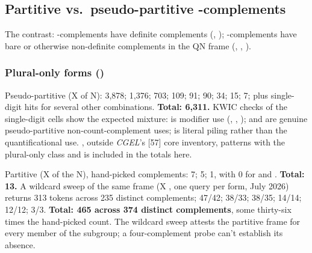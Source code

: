 \subsection{\texorpdfstring{Partitive vs.~pseudo-partitive -complements}{Partitive vs. pseudo-partitive of-complements}}\label{a.2-partitive-vs.-pseudo-partitive-of-complements}

The contrast:  -complements have definite complements (, );  -complements have bare or otherwise non-definite complements in the QN frame (, , ).

\subsubsection{\texorpdfstring{Plural-only forms ()}{Plural-only forms (lots, bags, heaps, loads, oodles, stacks, piles)}}

Pseudo-partitive (X of N):  3,878;  1,376;  703;  109;  91;  90;  34;  15;  7; plus single-digit hits for several other combinations. \textbf{Total: 6,311.} KWIC checks of the single-digit cells show the expected mixture:  is modifier use (, , );  and  are genuine pseudo-partitive non-count-complement uses;  is literal piling rather than the quantificational use. , outside \textit{CGEL}'s [57] core inventory, patterns with the plural-only class and is included in the totals here.

Partitive (X of the N), hand-picked complements:  7;  5;  1, with 0 for  and . \textbf{Total: 13.} A wildcard sweep of the same frame (X , one query per form, July 2026) returns  313 tokens across 235 distinct complements;  47/42;  38/33;  38/35;  14/14;  12/12;  3/3. \textbf{Total: 465 across 374 distinct complements}, some thirty-six times the hand-picked count. The wildcard sweep attests the partitive frame for every member of the subgroup; a four-complement probe can't establish its absence.

